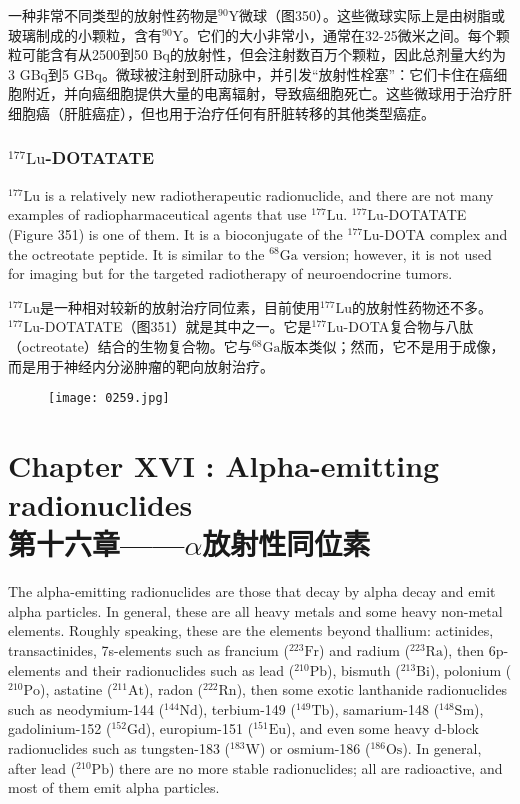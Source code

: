 \documentclass[dvipsnames, svgnames,a4paper,11pt]{article}
\begin{document}
一种非常不同类型的放射性药物是\(\mathrm{^{90}Y}\)微球（图350）。这些微球实际上是由树脂或玻璃制成的小颗粒，含有\(\mathrm{^{90}Y}\)。它们的大小非常小，通常在32-25微米之间。每个颗粒可能含有从2500到50 Bq的放射性，但会注射数百万个颗粒，因此总剂量大约为3 GBq到5 GBq。微球被注射到肝动脉中，并引发“放射性栓塞”：它们卡住在癌细胞附近，并向癌细胞提供大量的电离辐射，导致癌细胞死亡。这些微球用于治疗肝细胞癌（肝脏癌症），但也用于治疗任何有肝脏转移的其他类型癌症。

\subsubsection{\(\mathrm{^{177}Lu}\)-DOTATATE}  
\(\mathrm{^{177}Lu}\) is a relatively new radiotherapeutic radionuclide, and there are not many examples of radiopharmaceutical agents that use \(\mathrm{^{177}Lu}\). \(\mathrm{^{177}Lu}\)-DOTATATE (Figure 351) is one of them. It is a bioconjugate of the \(\mathrm{^{177}Lu}\)-DOTA complex and the octreotate peptide. It is similar to the \(\mathrm{^{68}Ga}\) version; however, it is not used for imaging but for the targeted radiotherapy of neuroendocrine tumors.

\(\mathrm{^{177}Lu}\)是一种相对较新的放射治疗同位素，目前使用\(\mathrm{^{177}Lu}\)的放射性药物还不多。\(\mathrm{^{177}Lu}\)-DOTATATE（图351）就是其中之一。它是\(\mathrm{^{177}Lu}\)-DOTA复合物与八肽（octreotate）结合的生物复合物。它与\(\mathrm{^{68}Ga}\)版本类似；然而，它不是用于成像，而是用于神经内分泌肿瘤的靶向放射治疗。

\begin{figure}[h]
    \centering
    \texttt{[image: 0259.jpg]}
     \label{fig351}
\end{figure}

\newpage


\section{Chapter XVI : Alpha-emitting radionuclides\\第十六章——$\alpha$放射性同位素}  
The alpha-emitting radionuclides are those that decay by alpha decay and emit alpha particles. In general, these are all heavy metals and some heavy non-metal elements. Roughly speaking, these are the elements beyond thallium: actinides, transactinides, 7s-elements such as francium (\(\mathrm{^{223}Fr}\)) and radium (\(\mathrm{^{223}Ra}\)), then 6p-elements and their radionuclides such as lead (\(\mathrm{^{210}Pb}\)), bismuth (\(\mathrm{^{213}Bi}\)), polonium (\(\mathrm{^{210}Po}\)), astatine (\(\mathrm{^{211}At}\)), radon (\(\mathrm{^{222}Rn}\)), then some exotic lanthanide radionuclides such as neodymium-144 (\(\mathrm{^{144}Nd}\)), terbium-149 (\(\mathrm{^{149}Tb}\)), samarium-148 (\(\mathrm{^{148}Sm}\)), gadolinium-152 (\(\mathrm{^{152}Gd}\)), europium-151 (\(\mathrm{^{151}Eu}\)), and even some heavy d-block radionuclides such as tungsten-183 (\(\mathrm{^{183}W}\)) or osmium-186 (\(\mathrm{^{186}Os}\)). In general, after lead (\(\mathrm{^{210}Pb}\)) there are no more stable radionuclides; all are radioactive, and most of them emit alpha particles.  
\end{document}
